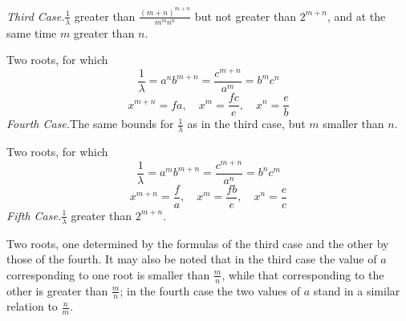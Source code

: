 \textit{Third Case.}\quad $\frac{1}{\lambda}$ greater than $\frac{(m+n)^{m+n}}{m^mn^n}$ but not greater than $2^{m+n}$, and at the same time
$m$ greater than $n$.

Two roots, for which
\[
\frac{1}{\lambda}=a^nb^{m+n}=\frac{c^{m+n}}{a^m}=b^mc^n
\]
\[
x^{m+n}=fa,\quad x^m=\frac{fc}{e},\quad x^n=\frac{e}{b}
\]
\textit{Fourth Case.}\quad The same bounds for $\frac{1}{\lambda}$ as in the third case, but $m$ smaller
than $n$.

Two roots, for which
\[
\frac{1}{\lambda}=a^mb^{m+n}=\frac{c^{m+n}}{a^n}=b^nc^m
\]
\[
x^{m+n}=\frac{f}{a},\quad x^m=\frac{fb}{e},\quad x^n=\frac{e}{c}
\]
\textit{Fifth Case.}\quad $\frac{1}{\lambda}$ greater than $2^{m+n}$.

Two roots, one determined by the formulas of the third case and
the other by those of the fourth.
It may also be noted that in the third case the value of $a$ corresponding to one root is smaller than $\frac{m}{n}$, while that corresponding to the other is greater than $\frac{m}{n}$; in the fourth case the two values of
$a$ stand in a similar relation to $\frac{n}{m}$.

